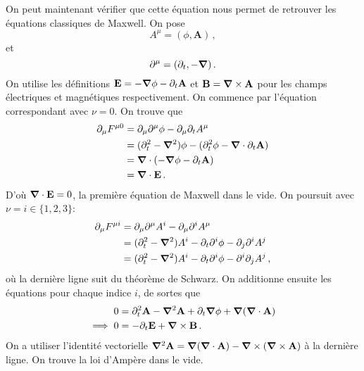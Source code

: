 \documentclass{article}
\numberwithin{equation}{section}
\theoremstyle{solution}
\begin{document}
On peut maintenant vérifier que cette équation nous permet de retrouver les équations classiques de Maxwell. On pose
\begin{equation}
        A^{\mu} = (\phi, \mathbf{A})\, ,
\end{equation} 
et
\begin{equation}
        \partial^{\mu} = (\partial_{t}, -\grad)\, .
\end{equation} 
On utilise les définitions $\mathbf{E} = -\grad \phi - \partial_t \mathbf{A}$ et $\mathbf{B} = \grad \times \mathbf{A}$ pour les 
champs électriques et magnétiques respectivement.
On commence par l'équation correspondant avec $\nu=0$.
On trouve que
\begin{align*}
        \partial_{\mu}F^{\mu 0} &= \partial_{\mu} \partial^{\mu}\phi - \partial_{\mu}\partial_{t}A^{\mu} \\
                &= (\partial_{t}^{2} - \grad^{2})\phi - (\partial_{t}^{2}\phi - \grad \cdot \partial_{t}\mathbf{A}) \\
                &= \grad \cdot (-\grad \phi - \partial_t \mathbf{A}) \\
                &= \grad \cdot \mathbf{E}\, .
\end{align*}
D'où $\grad \cdot \mathbf{E} = 0$, la première équation de Maxwell dans le vide.
On poursuit avec $\nu = i \in \{1,2,3\}$:
\begin{align*}
        \partial_{\mu}F^{\mu i} &= \partial_{\mu}\partial^{\mu}A^{i} - \partial_{\mu}\partial^{i}A^{\mu} \\
                &= (\partial_{t}^{2} - \grad^{2})A^{i} - \partial_{t}\partial^{i}\phi - \partial_{j}\partial^{i}A^{j} \\
                &= (\partial_{t}^{2} - \grad^{2})A^{i} - \partial_{t}\partial^{i}\phi - \partial^{i}\partial_j A^{j}\, ,
\end{align*}
où la dernière ligne suit du théorème de Schwarz. 
On additionne ensuite les équations pour chaque indice $i$, de sortes que 
\begin{align*}
        0 &= \partial_{t}^{2}\mathbf{A} - \grad^{2}\mathbf{A} + \partial_{t}\grad \phi + \grad (\grad \cdot \mathbf{A}) \\
        \implies 0 &= -\partial_{t}\mathbf{E} + \grad \times \mathbf{B}\, .
\end{align*}
On a utiliser l'identité vectorielle $\grad^{2}\mathbf{A} = \grad (\grad \cdot \mathbf{A}) - \grad \times (\grad \times \mathbf{A})$ à la dernière ligne. 
On trouve la loi d'Ampère dans le vide. 
\end{document}
